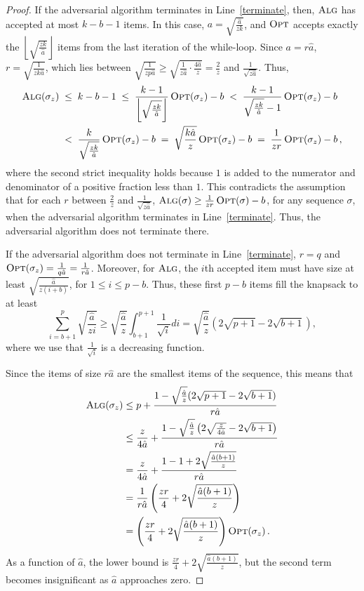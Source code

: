 \documentclass[a4paper,UKenglish,cleveref, autoref, thm-restate]{lipics-v2021}
\newcommand{\ALG}{\ensuremath{\operatorname{\textsc{Alg}}}\xspace}
\newcommand{\OPT}{\ensuremath{\operatorname{\textsc{Opt}}}\xspace}
\newcommand{\guess}{\ensuremath{\hat{a}}\xspace}
\begin{document}
\begin{proof}
If the adversarial algorithm terminates in Line~\ref{terminate}, then,
\ALG has accepted at most $k-b-1$ items.  In this case,
$a=\sqrt{\frac{\guess}{zk}}$, and \OPT accepts exactly the
$\left\lfloor \sqrt{\frac{zk}{\guess}}\right\rfloor$ items from the last
iteration of the while-loop. Since $a=r\guess$, $r=\sqrt {\frac{1}{zk\guess}}$, which lies between
$\sqrt{\frac{1}{zp\guess}} \geq \sqrt{\frac{1}{z\guess} \cdot \frac{4\guess}{z}} =
\frac{2}{z}$ and $\frac{1}{\sqrt{z\guess}}$.  Thus,
\begin{align*}
\ALG(\sigma_z)
& \; \leq \; k-b-1 
  \; \leq \; \frac{k-1}{\left\lfloor\sqrt{\frac{zk}{\guess}}\right\rfloor}\OPT(\sigma_z)-b 
  \; < \; \frac{k-1}{\sqrt{\frac{zk}{\guess}}-1}\OPT(\sigma_z)-b \\
& \; < \; \frac{k}{\sqrt{\frac{zk}{\guess}}}\OPT(\sigma_z)-b 
  \; = \; \sqrt{\frac{k\guess}{z}}\OPT(\sigma_z)-b 
  \; = \; \frac{1}{zr}\OPT(\sigma_z)-b \,,
\end{align*}
where the second strict inequality holds because $1$  is
added to the numerator and denominator of a positive fraction less than $1$.
This contradicts the assumption that for each $r$
  between $\frac2z$ and $\frac{1}{\sqrt{z\guess}}$, 
  $\ALG(\sigma) \geq \frac{1}{zr} \OPT(\sigma)-b$, for any sequence
  $\sigma$, when the adversarial algorithm terminates in Line~\ref{terminate}.
  Thus, the adversarial algorithm does not terminate there.
  
  If the adversarial algorithm does not terminate in
  Line~\ref{terminate}, $r=q$ and
  $\OPT(\sigma_z) = \frac{1}{q\guess} =
  \frac{1}{r\guess}$.  Moreover, for \ALG, the $i$th accepted
  item must have size at least $\sqrt{\frac{\guess}{z(i+b)}}$, for
  $1 \leq i \leq p-b$. Thus, these first $p-b$ items fill the knapsack to
  at least
$$\sum_{i=b+1}^{p}
\sqrt{\frac{\guess}{zi}}\geq \sqrt{\frac{\guess}{z}}\int_{b+1}^{p+1}
\frac{1}{\sqrt{i}}di = \sqrt{\frac{\guess}{z}} (2\sqrt{p+1}-2\sqrt{b+1}),$$
where we use that $\frac{1}{\sqrt{i}}$ is a decreasing function.

Since the items of size $r\guess$ are the smallest items of the sequence,
  this means that
\begin{align*}
  \ALG(\sigma_z)
  & \leq p+\frac{1-\sqrt{\frac{\guess}{z}} (2\sqrt{p+1}-2\sqrt{b+1})}{r\guess} \\
  & \leq \frac{z}{4\guess}+\frac{1-\sqrt{\frac{\guess}{z}} \left(2\sqrt{\frac{z}{4\guess}}-2\sqrt{b+1}\right)}{r\guess} \\
  & = \frac{z}{4\guess}+\frac{1- 1 + 2\sqrt{\frac{\guess(b+1)}{z}}}{r\guess} \\
  & =\frac{1}{r\guess}\left(\frac{zr}{4}+2\sqrt{\frac{\guess(b+1)}{z}}\right) \\
  & = \left(\frac{zr}{4}+2\sqrt{\frac{\guess(b+1)}{z}}\right)\OPT(\sigma_z)\,.
\end{align*}
As a function of $\guess$, the lower bound is
$\frac{zr}{4}+2\sqrt{\frac{\guess(b+1)}{z}}$, but the second term becomes
insignificant as $\guess$ approaches zero.


\end{proof}
\end{document}

